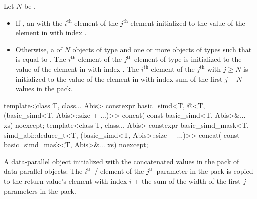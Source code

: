   \begin{itemdescr}

    \pnum Let $N$ be .

    \pnum\returns
    \begin{itemize}
      \item If , an  with
        the $i^\text{th}$ \simd element of the $j^\text{th}$ 
        element initialized to the value of the element in  with index
        .

      \item Otherwise, a  of $N$ objects of type  and one
        or more objects of types  such that
         is equal to .
        The $i^\text{th}$  element of the $j^\text{th}$ 
        element of type  is initialized to the value of the element in
         with index .
        The $i^\text{th}$  element of the $j^\text{th}$ 
        with $j \ge N$ is initialized to the value of the element in 
        with index  sum of the first $j - N$
        values in the  pack.
    \end{itemize}
  \end{itemdescr}

\begin{itemdecl}
template<class T, class... Abis>
  constexpr basic_simd<T, @\seebelow@<T, (basic_simd<T, Abis>::size + ...)>> concat(
    const basic_simd<T, Abis>&... xs) noexcept;
template<class T, class... Abis>
  constexpr basic_simd_mask<T, simd_abi::deduce_t<T, (basic_simd<T, Abis>::size + ...)>> concat(
    const basic_simd_mask<T, Abis>&... xs) noexcept;

\end{itemdecl}

\begin{itemdescr}
  \pnum\returns
  A data-parallel object initialized with the concatenated values in the  pack of data-parallel objects: The $i^\text{th}$ / element of the $j^\text{th}$ parameter in the  pack is copied to the return value's element with index $i$ + the sum of the width of the first $j$ parameters in the  pack.
\end{itemdescr}

